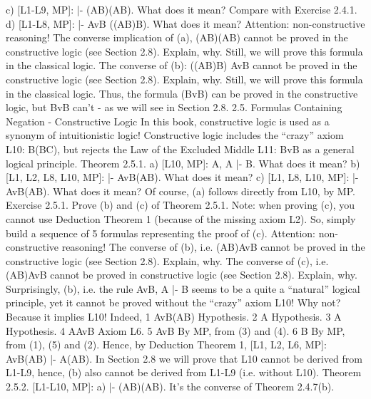 c) [L1-L9, MP]: |- (A\IMPLIES B)\IMPLIES \neg (A\AND \neg B). What does it mean? Compare with Exercise 2.4.1.
d) [L1-L8, MP]: |- AvB \IMPLIES  ((A\IMPLIES B)\IMPLIES B). What does it mean?
Attention: non-constructive reasoning! The converse implication of (a), \neg (A\AND \neg B)\IMPLIES (A\IMPLIES B) cannot be
proved in the constructive logic (see Section 2.8). Explain, why. Still, we will prove this formula in the
classical logic.
The converse of (b): ((A\IMPLIES B)\IMPLIES B) \IMPLIES  AvB cannot be proved in the constructive logic (see Section 2.8).
Explain, why. Still, we will prove this formula in the classical logic.
Thus, the formula \neg \neg (Bv\neg B) can be proved in the constructive logic, but Bv\neg B can't - as we will see in
Section 2.8.
2.5. Formulas Containing Negation - Constructive Logic
In this book, constructive logic is used as a synonym of intuitionistic logic!
Constructive logic includes the ``crazy'' axiom L10: \neg B\IMPLIES (B\IMPLIES C), but rejects the Law of the Excluded
Middle L11: Bv\neg B as a general logical principle.
Theorem 2.5.1. a) [L10, MP]: A, \neg A |- B. What does it mean?
b) [L1, L2, L8, L10, MP]: |- AvB\IMPLIES (\neg A\IMPLIES B). What does it mean?
c) [L1, L8, L10, MP]: |- \neg AvB\IMPLIES (A\IMPLIES B). What does it mean?
Of course, (a) follows directly from L10, by MP.
Exercise 2.5.1. Prove (b) and (c) of Theorem 2.5.1. Note: when proving (c), you cannot use Deduction
Theorem 1 (because of the missing axiom L2). So, simply build a sequence of 5 formulas representing the
proof of (c).
Attention: non-constructive reasoning! The converse of (b), i.e. (\neg A\IMPLIES B)\IMPLIES AvB cannot be proved in
the constructive logic (see Section 2.8). Explain, why. The converse of (c), i.e. (A\IMPLIES B)\IMPLIES \neg AvB cannot be
proved in constructive logic (see Section 2.8). Explain, why.
Surprisingly, (b), i.e. the rule AvB, \neg A |- B seems to be a quite a ``natural'' logical principle, yet it cannot
be proved without the ``crazy'' axiom L10! Why not? Because it implies L10! Indeed,
1 AvB\IMPLIES (\neg A\IMPLIES B) Hypothesis.
2 \neg A Hypothesis.
3 A Hypothesis.
4 A\IMPLIES AvB Axiom L6.
5 AvB By MP, from (3) and (4).
6 B By MP, from (1), (5) and (2).
Hence, by Deduction Theorem 1, [L1, L2, L6, MP]: AvB\IMPLIES (\neg A\IMPLIES B) |- \neg A\IMPLIES (A\IMPLIES B).
In Section 2.8 we will prove that L10 cannot be derived from L1-L9, hence, (b) also cannot be derived
from L1-L9 (i.e. without L10).
Theorem 2.5.2. [L1-L10, MP]: a) |- (\neg \neg A\IMPLIES \neg \neg B)\IMPLIES \neg \neg (A\IMPLIES B). It's the converse of Theorem 2.4.7(b).
